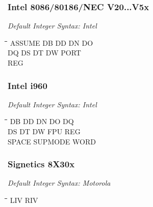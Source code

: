 \subsubsection{Intel 8086/80186/NEC V20...V5x}

{\em Default Integer Syntax: Intel}

{\tt\begin{tabbing}
\hspace{3cm}\=\hspace{3cm}\=\hspace{3cm}\=\hspace{3cm}\=\kill
ASSUME     \> DB          \> DD          \> DN          \> DO \\
DQ         \> DS          \> DT          \> DW          \> PORT \\
REG \\
\end{tabbing}}

\subsubsection{Intel i960}

{\em Default Integer Syntax: Intel}

{\tt\begin{tabbing}
\hspace{3cm}\=\hspace{3cm}\=\hspace{3cm}\=\hspace{3cm}\=\kill    
DB         \> DD          \> DN          \> DO          \> DQ \\
DS         \> DT          \> DW          \> FPU         \> REG \\
SPACE      \> SUPMODE     \> WORD \\
\end{tabbing}}

\subsubsection{Signetics 8X30x}

{\em Default Integer Syntax: Motorola}

{\tt\begin{tabbing}
\hspace{3cm}\=\hspace{3cm}\=\hspace{3cm}\=\hspace{3cm}\=\kill
LIV        \> RIV         \\   
\end{tabbing}}

